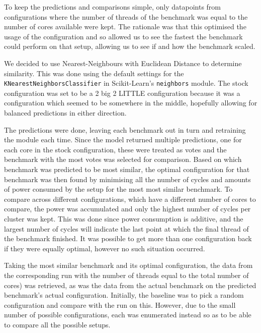    To keep the predictions and comparisons simple, only datapoints from 
    configurations where the number of threads of the benchmark was equal to 
    the number of cores available were kept. The rationale was that this 
    optimised the usage of the configuration and so allowed us to see the 
    fastest the benchmark could perform on that setup, allowing us to see if and
    how the benchmark scaled.
    
    We decided to use Nearest-Neighbours with Euclidean Distance to determine 
    similarity. This was done using the default settings for the 
    \texttt{KNearestNeighborsClassifier} in Scikit-Learn's 
    \cite{pedregosa_scikit-learn_2011} \texttt{neighbors} module. The stock 
    configuration was set to be a 2 big 2 LITTLE configuration because it was a 
    configuration which seemed to be somewhere in the middle, hopefully 
    allowing for balanced predictions in either direction.
    
    The predictions were done, leaving each benchmark out in turn and 
    retraining the module each time. Since the model returned multiple 
    predictions, one for each core in the stock configuration, these were 
    treated as votes and the benchmark with the most votes was selected for 
    comparison. Based on which benchmark was predicted to be most similar, the 
    optimal configuration for that benchmark was then found by minimising all 
    the number of cycles and amounts of power consumed by the setup for the most
    most similar benchmark. To compare across different configurations, which 
    have a different number of cores to compare, the power was accumulated and 
    only the highest number of cycles per cluster was kept. This was done since 
    power consumption is additive, and the largest number of cycles will 
    indicate the last point at which the final thread of the benchmark finished.
    It was possible to get more than one configuration back if they were equally
    optimal, however no such situation occurred.
    
    Taking the most similar benchmark and its optimal configuration, the data 
    from the corresponding run with the number of threads equal to the total 
    number of cores) was retrieved, as was the data from the actual benchmark on
    the predicted benchmark's actual configuration. Initially, the baseline was 
    to pick a random configuration and compare with the run on this. However, 
    due to the small number of possible configurations, each was enumerated 
    instead so as to be able to compare all the possible setups.
    
